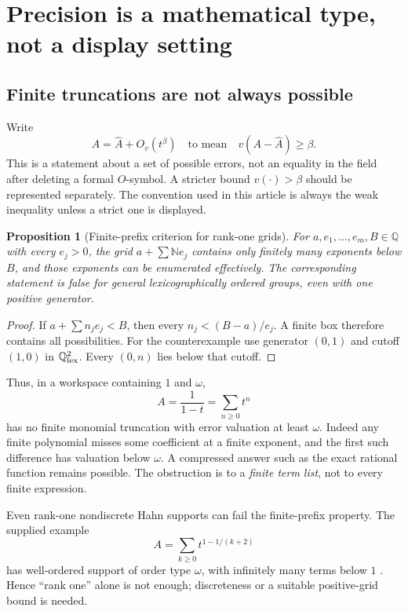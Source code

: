 \documentclass[11pt,letterpaper]{article}
\numberwithin{equation}{section}
\newtheorem{proposition}[theorem]{Proposition}
\theoremstyle{definition}
\theoremstyle{remark}\newtheorem{remark}[theorem]{Remark}
\newcommand{\Q}{\mathbb Q}
\newcommand{\N}{\mathbb N}
\newcommand{\Oh}[1]{O_v(t^{#1})}
\begin{document}
\section{Precision is a mathematical type, not a display setting}
\label{sec:precision}

\subsection{Finite truncations are not always possible}
Write
\[
 A=\widehat A+\Oh{\beta}
 \quad\text{to mean}\quad v(A-\widehat A)\ge\beta.
\]
This is a statement about a set of possible errors, not an equality in the
field after deleting a formal $O$-symbol. A stricter bound $v(\cdot)>\beta$
should be represented separately. The convention used in this article is
always the weak inequality unless a strict one is displayed.

\begin{proposition}[Finite-prefix criterion for rank-one grids]
\label{prop:finiteprefix}
For $a,e_1,\ldots,e_m,B\in\Q$ with every $e_j>0$, the grid
$a+\sum\N e_j$ contains only finitely many exponents below $B$, and those
exponents can be enumerated effectively. The corresponding statement is
false for general lexicographically ordered groups, even with one positive
generator.
\end{proposition}
\begin{proof}
If $a+\sum n_je_j<B$, then every $n_j<(B-a)/e_j$. A finite box therefore
contains all possibilities. For the counterexample use generator $(0,1)$
and cutoff $(1,0)$ in $\Q^2_{\rm lex}$. Every $(0,n)$ lies below that cutoff.
\end{proof}
Thus, in a workspace containing $1$ and $\omega$,
\[
 A=\frac1{1-t}=\sum_{n\ge0}t^n
\]
has no finite monomial truncation with error valuation at least $\omega$.
Indeed any finite polynomial misses some coefficient at a finite exponent,
and the first such difference has valuation below $\omega$. A compressed
answer such as the exact rational function remains possible. The obstruction
is to a \emph{finite term list}, not to every finite expression.

Even rank-one nondiscrete Hahn supports can fail the finite-prefix property.
The supplied example
\begin{equation}\label{eq:accumulating}
 A=\sum_{k\ge0}t^{1-1/(k+2)}
\end{equation}
has well-ordered support of order type $\omega$, with infinitely many terms
below $1$ \cite{SourcePolynomial,SourceResearch}. Hence ``rank one'' alone
is not enough; discreteness or a suitable positive-grid bound is needed.
\end{document}
